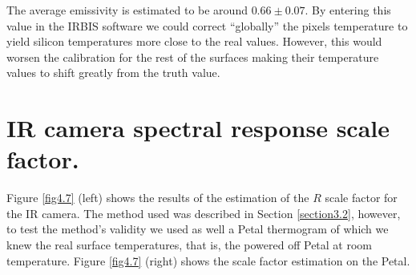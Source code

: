 		The average emissivity is estimated to be around $0.66 \pm 0.07$. By entering this value in the IRBIS software we could correct “globally” the pixels temperature to yield silicon temperatures more close to the real values. However, this would worsen the calibration for the rest of the surfaces making their temperature values to shift greatly from the truth value.\bigskip
		
	\section{IR camera spectral response scale factor.}\label{section4.4}
	
		Figure \ref{fig4.7} (left) shows the results of the estimation of the $R$ scale factor for the IR camera. The method used was described in Section \ref{section3.2}, however, to test the method’s validity we used as well a Petal thermogram of which we knew the real surface temperatures, that is, the powered off Petal at room temperature. Figure \ref{fig4.7} (right) shows the scale factor estimation on the Petal.
		
